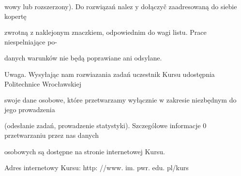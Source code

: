 \documentclass[a4paper,12pt]{article}
\begin{document}
wowy lub rozszerzony). Do rozwiązań nalez $\mathrm{y}$ dołączyč zaadresowaną do siebie kopertę

zwrotną $\mathrm{z}$ naklejonym znaczkiem, odpowiednim do wagi listu. Prace niespelniające po-

danych warunków nie będą poprawiane ani odsylane.

Uwaga. Wysyłając nam rozwiazania zadań uczestnik Kursu udostępnia Politechnice Wrocławskiej

swoje dane osobowe, które przetwarzamy wyłącznie $\mathrm{w}$ zakresie niezbędnym do jego prowadzenia

(odesłanie zadań, prowadzenie statystyki). Szczególowe informacje $0$ przetwarzaniu przez nas danych

osobowych są dostępne na stronie internetowej Kursu.

Adres internetowy Kursu: http: //www. im. pwr. edu. pl/kurs
\end{document}
